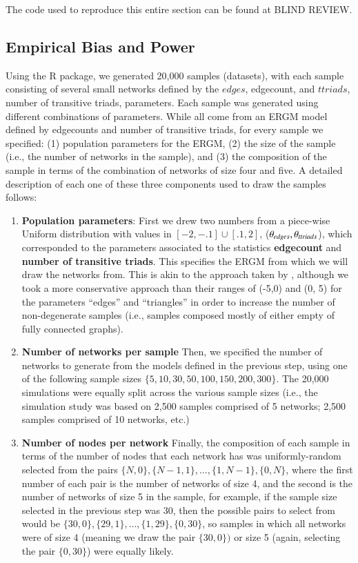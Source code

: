 \documentclass[review, nonatbib,doubleblind]{elsarticle/elsarticle}
\begin{document}
The code used to reproduce this entire section can be found at BLIND REVIEW. %

\subsection{\label{subsec:design}Empirical Bias and Power}

Using the \ergmito{} R package, we generated 20,000 samples (datasets), with each sample consisting of several small networks defined by the $edges$, edgecount, and $ttriads$, number of transitive triads, parameters. Each sample was generated using different combinations of parameters. While all come from an ERGM model defined by edgecounts and number of transitive triads, for every sample we specified: (1) population parameters for the ERGM, (2) the size of the sample (i.e., the number of networks in the sample), and (3) the composition of the sample in terms of the combination of networks of size four and five. A detailed description of each one of these three components used to draw the samples follows:

\begin{enumerate}
\item \textbf{Population parameters}: First we drew two numbers from a piece-wise Uniform distribution with values in $[-2, -.1]\cup[.1, 2]$, ($\theta_{edges}, \theta_{ttriads}$), which corresponded to the parameters associated to the statistics \textbf{edgecount} and \textbf{number of transitive triads}. This specifies the ERGM from which we will draw the networks from. This is akin to the approach taken by \cite{Schweinberger2015} , although we took a more conservative approach than their ranges of (-5,0) and (0, 5) for the parameters ``edges'' and ``triangles'' in order to increase the number of non-degenerate samples (i.e., samples composed mostly of either empty of fully connected graphs).

\item \textbf{Number of networks per sample} Then, we specified the number of networks to generate from the models defined in the previous step, using one of the following sample sizes $\{5, 10, 30, 50, 100, 150, 200, 300\}$. The 20,000 simulations were equally split across the various sample sizes (i.e., the simulation study was based on 2,500 samples comprised of 5 networks; 2,500 samples comprised of 10 networks, etc.)

\item \textbf{Number of nodes per network} Finally, the composition of each sample in terms of the number of nodes that each network has was uniformly-random selected from the pairs $\{N, 0\}, \{N - 1, 1\}, \dots, \{1, N - 1\}, \{0, N\}$, where the first number of each pair is the number of networks of size 4, and the second is the number of networks of size 5 in the sample, for example, if the sample size selected in the previous step was 30, then the possible pairs to select from would be $\{30, 0\}, \{29, 1\}, \dots, \{1, 29\}, \{0, 30\}$, so samples in which all networks were of size 4 (meaning we draw the pair $\{30, 0\})$ or size 5 (again, selecting the pair  $\{0, 30\}$) were equally likely. 
\end{enumerate}
\end{document}
